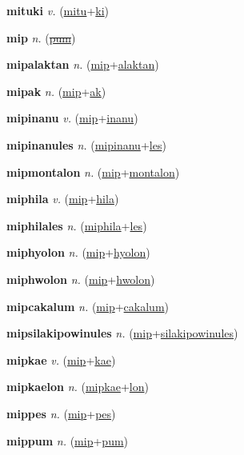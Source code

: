 \textbf{\hypertarget{mituki}{mituki}} \textit{v.} (\hyperlink{mitu}{mitu}+\allowbreak \hyperlink{ki}{ki})


\textbf{\hypertarget{mip}{mip}} \textit{n.} (\hyperlink{pum}{\sout{pum}})


\textbf{\hypertarget{mipalaktan}{mipalaktan}} \textit{n.} (\hyperlink{mip}{mip}+\allowbreak \hyperlink{alaktan}{alaktan})


\textbf{\hypertarget{mipak}{mipak}} \textit{n.} (\hyperlink{mip}{mip}+\allowbreak \hyperlink{ak}{ak})


\textbf{\hypertarget{mipinanu}{mipinanu}} \textit{v.} (\hyperlink{mip}{mip}+\allowbreak \hyperlink{inanu}{inanu})


\textbf{\hypertarget{mipinanules}{mipinanules}} \textit{n.} (\hyperlink{mipinanu}{mipinanu}+\allowbreak \hyperlink{les}{les})


\textbf{\hypertarget{mipmontalon}{mipmontalon}} \textit{n.} (\hyperlink{mip}{mip}+\allowbreak \hyperlink{montalon}{montalon})


\textbf{\hypertarget{miphila}{miphila}} \textit{v.} (\hyperlink{mip}{mip}+\allowbreak \hyperlink{hila}{hila})


\textbf{\hypertarget{miphilales}{miphilales}} \textit{n.} (\hyperlink{miphila}{miphila}+\allowbreak \hyperlink{les}{les})


\textbf{\hypertarget{miphyolon}{miphyolon}} \textit{n.} (\hyperlink{mip}{mip}+\allowbreak \hyperlink{hyolon}{hyolon})


\textbf{\hypertarget{miphwolon}{miphwolon}} \textit{n.} (\hyperlink{mip}{mip}+\allowbreak \hyperlink{hwolon}{hwolon})


\textbf{\hypertarget{mipcakalum}{mipcakalum}} \textit{n.} (\hyperlink{mip}{mip}+\allowbreak \hyperlink{cakalum}{cakalum})


\textbf{\hypertarget{mipsilakipowinules}{mipsilakipowinules}} \textit{n.} (\hyperlink{mip}{mip}+\allowbreak \hyperlink{silakipowinules}{silakipowinules})


\textbf{\hypertarget{mipkae}{mipkae}} \textit{v.} (\hyperlink{mip}{mip}+\allowbreak \hyperlink{kae}{kae})


\textbf{\hypertarget{mipkaelon}{mipkaelon}} \textit{n.} (\hyperlink{mipkae}{mipkae}+\allowbreak \hyperlink{lon}{lon})


\textbf{\hypertarget{mippes}{mippes}} \textit{n.} (\hyperlink{mip}{mip}+\allowbreak \hyperlink{pes}{pes})


\textbf{\hypertarget{mippum}{mippum}} \textit{n.} (\hyperlink{mip}{mip}+\allowbreak \hyperlink{pum}{pum})


